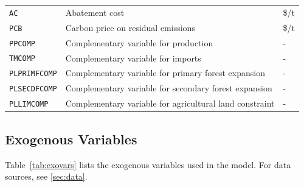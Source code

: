 \begin{xltabular}{\linewidth}{l X l}
  \texttt{AC} & Abatement cost & \$/t \\
  \texttt{PCB} & Carbon price on residual emissions & \$/t \\
  \texttt{PPCOMP} & Complementary variable for production & - \\
  \texttt{TMCOMP} & Complementary variable for imports & - \\
  \texttt{PLPRIMFCOMP} & Complementary variable for primary forest expansion & - \\
  \texttt{PLSECDFCOMP} & Complementary variable for secondary forest expansion & - \\
  \texttt{PLLIMCOMP} & Complementary variable for agricultural land constraint & - \\
\end{xltabular}


\subsection{Exogenous Variables}
Table~\ref{tab:exovars} lists the exogenous variables used in the model. For data sources, see \cref{sec:data}.

